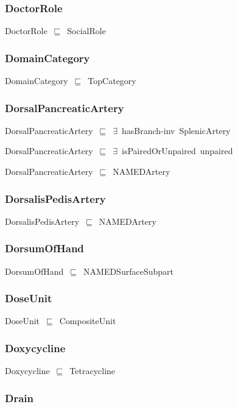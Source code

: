 \documentclass{article}
\begin{document}
\subsubsection*{DoctorRole}

DoctorRole~\ensuremath{\sqsubseteq}~SocialRole~

\subsubsection*{DomainCategory}

DomainCategory~\ensuremath{\sqsubseteq}~TopCategory~

\subsubsection*{DorsalPancreaticArtery}

DorsalPancreaticArtery~\ensuremath{\sqsubseteq}~\ensuremath{\exists}~hasBranch-inv~SplenicArtery~

DorsalPancreaticArtery~\ensuremath{\sqsubseteq}~\ensuremath{\exists}~isPairedOrUnpaired~unpaired~

DorsalPancreaticArtery~\ensuremath{\sqsubseteq}~NAMEDArtery~

\subsubsection*{DorsalisPedisArtery}

DorsalisPedisArtery~\ensuremath{\sqsubseteq}~NAMEDArtery~

\subsubsection*{DorsumOfHand}

DorsumOfHand~\ensuremath{\sqsubseteq}~NAMEDSurfaceSubpart~

\subsubsection*{DoseUnit}

DoseUnit~\ensuremath{\sqsubseteq}~CompositeUnit~

\subsubsection*{Doxycycline}

Doxycycline~\ensuremath{\sqsubseteq}~Tetracycline~

\subsubsection*{Drain}
\end{document}
